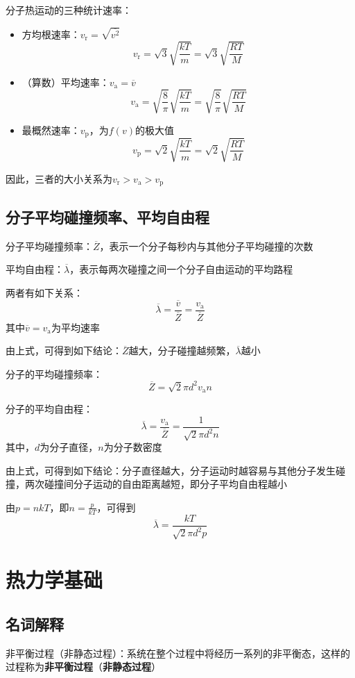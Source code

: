 \documentclass[12pt, a4paper, twoside]{ctexbook}
\begin{document}
{\sonti 分子热运动的三种统计速率}：
\begin{itemize}
    \item {\sonti 方均根速率}：$v_\mathrm{r}=\sqrt{\overline{v^2}}$
    $$
    v_\mathrm{r}=\sqrt{3}\sqrt{\frac{kT}{m}}=\sqrt{3}\sqrt{\frac{RT}{M}}
    $$
    \item {\sonti （算数）平均速率}：$v_\mathrm{a}=\overline{v}$
    $$
    v_\mathrm{a}=\sqrt{\frac{8}{\pi}}\sqrt{\frac{kT}{m}}=\sqrt{\frac{8}{\pi}}\sqrt{\frac{RT}{M}}
    $$
    \item {\sonti 最概然速率}：$v_\mathrm{p}$，为$f\left(v\right)$的极大值
    $$
    v_\mathrm{p}=\sqrt{2}\sqrt{\frac{kT}{m}}=\sqrt{2}\sqrt{\frac{RT}{M}}
    $$
\end{itemize}
因此，三者的大小关系为$v_\mathrm{r}>v_\mathrm{a}>v_\mathrm{p}$
\section{分子平均碰撞频率、平均自由程}
{\sonti 分子平均碰撞频率}：$\overline{Z}$，表示一个分子每秒内与其他分子平均碰撞的次数

{\sonti 平均自由程}：$\overline{\lambda}$，表示每两次碰撞之间一个分子自由运动的平均路程

两者有如下关系：
$$
\overline{\lambda}=\frac{\overline{v}}{\overline{Z}}=\frac{v_\mathrm{a}}{\overline{Z}}
$$
其中$\overline{v}=v_\mathrm{a}$为平均速率

由上式，可得到如下结论：$\overline{Z}$越大，分子碰撞越频繁，$\overline{\lambda}$越小

{\sonti 分子的平均碰撞频率}：
$$
\overline{Z}=\sqrt{2}\pi d^2 v_\mathrm{a} n
$$

{\sonti 分子的平均自由程}：
$$
\overline{\lambda}=\frac{v_\mathrm{a}}{\overline{Z}}=\frac{1}{\sqrt{2}\pi d^2 n}
$$
其中，$d$为分子直径，$n$为分子数密度

由上式，可得到如下结论：分子直径越大，分子运动时越容易与其他分子发生碰撞，两次碰撞间分子运动的自由距离越短，即分子平均自由程越小

由$p=nkT$，即$n=\frac{p}{kT}$，可得到
$$
\overline{\lambda}=\frac{kT}{\sqrt{2}\pi d^2 p}
$$
\chapter{热力学基础}
\newpage
\section{名词解释}
{\sonti 非平衡过程（非静态过程）}：系统在整个过程中将经历一系列的非平衡态，这样的过程称为\textbf{非平衡过程}{\sonti （}\textbf{非静态过程}{\sonti ）}
\end{document}
